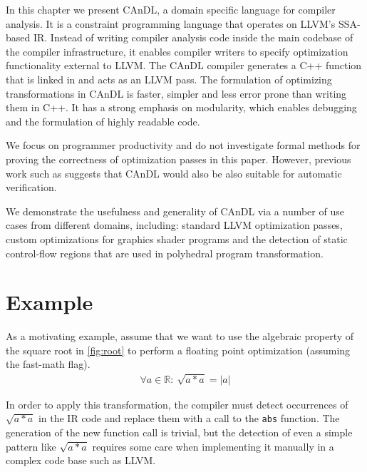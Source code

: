     In this chapter we present CAnDL, a domain specific language for compiler
    analysis.
    It is a constraint programming language that operates on LLVM’s SSA-based
    IR.
    Instead of writing compiler analysis  code inside the main codebase of the
    compiler infrastructure, it enables compiler writers to specify optimization
    functionality external to LLVM.
    The CAnDL compiler generates a C++ function that is linked in and acts as an
    LLVM pass.
    The formulation of optimizing transformations in CAnDL is faster, simpler
    and less error prone than writing them in C++.
    It has a strong emphasis on modularity, which enables debugging and the
    formulation of highly readable code.

    We focus on programmer productivity and do not investigate formal methods
    for proving the correctness of optimization passes in this paper.
    However, previous work such as \cite{Lopes:2015:PCP:2737924.2737965}
    suggests that CAnDL would also be also suitable for automatic verification.

    We demonstrate the usefulness and generality of CAnDL via a number of use
    cases from different domains, including: standard LLVM optimization passes,
    custom optimizations for graphics shader programs and the detection of
    static control-flow regions that are used in polyhedral program
    transformation.

\begin{figure}[p]
    
    \label{fig:candlexample}
\end{figure}

\section{Example}

    As a motivating example, assume that we want to use the algebraic property
    of the square root in \autoref{fig:root} to perform a floating point
    optimization (assuming the fast-math flag).
    \begin{align}
    \label{fig:root}
    \forall a\in \mathbb{R}\colon\ \sqrt{a*a}=|a|
    \end{align}

    In order to apply this transformation, the compiler must detect occurrences
    of $\sqrt{a*a}$ in the IR code and replace them with a call to the
    \texttt{abs} function.
    The generation of the new function call is trivial, but the detection of
    even a simple pattern like $\sqrt{a*a}$ requires some care when implementing
    it manually in a complex code base such as LLVM.

